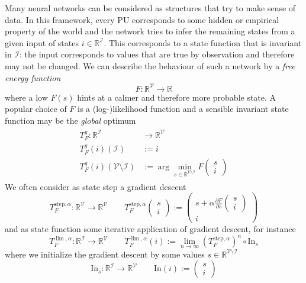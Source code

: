 \documentclass[a4paper,11pt]{article}
\begin{document}
\begin{Abs}
Many neural networks can be considered as structures that try to make sense of data. In this framework, every PU corresponds to some hidden or empirical property of the world and the network tries to infer the remaining states from a given input of states $i\in\mathbb{R}^{\mathcal{I}}$. This corresponds to a state function that is invariant in $\mathcal{I}$: the input corresponds to values that are true by observation and therefore may not be changed. We can describe the behaviour of such a network by a \emph{free energy function}
\begin{equation}
F:\mathbb{R}^{\mathcal{V}}\to\mathbb{R}
\end{equation}
where a low $F(s)$ hints at a calmer and therefore more probable state. A popular choice of $F$ is a (log-)likelihood function and a sensible invariant state function may be the \emph{global} optimum
\begin{align}
\begin{split}
T_F^g:\mathbb{R}^{\mathcal{I}}&\to\mathbb{R}^{\mathcal{V}}\\
T_F^g(i)(\mathcal{I})&:=i\\
T_F^g(i)(\mathcal{V}\setminus\mathcal{I})&:=\arg\min_{s\in\mathbb{R}^{\mathcal{V}\setminus\mathcal{I}}}F\begin{pmatrix}
s\\i
\end{pmatrix}
\end{split}
\end{align}
We often consider as state step a gradient descent
\begin{equation}
T_F^{\text{step},\alpha}:\mathbb{R}^{\mathcal{V}}\to\mathbb{R}^{\mathcal{V}}\qquad T_F^{\text{step},\alpha}\begin{pmatrix}
s\\i
\end{pmatrix}:=\begin{pmatrix}
s+\alpha\frac{\partial F}{\partial s}\begin{pmatrix}
s\\i
\end{pmatrix}\\i
\end{pmatrix}
\end{equation}
and as state function some iterative application of gradient descent, for instance
\begin{equation}
T_F^{\lim,\alpha}:\mathbb{R}^{\mathcal{I}}\to\mathbb{R}^{\mathcal{V}}\qquad T_F^{\lim,\alpha}(i):=\lim_{n\to\infty}\left(T_F^{\text{step},\alpha}\right)^n\circ\text{In}_s
\end{equation}
where we initialize the gradient descent by some values $s\in\mathbb{R}^{\mathcal{V}\setminus\mathcal{I}}$
\begin{equation}
\text{In}_s:\mathbb{R}^{\mathcal{I}}\to\mathbb{R}^{\mathcal{V}}\qquad \text{In}(i):=\begin{pmatrix}
s\\i
\end{pmatrix}
\end{equation}
\end{Abs}
\end{document}
